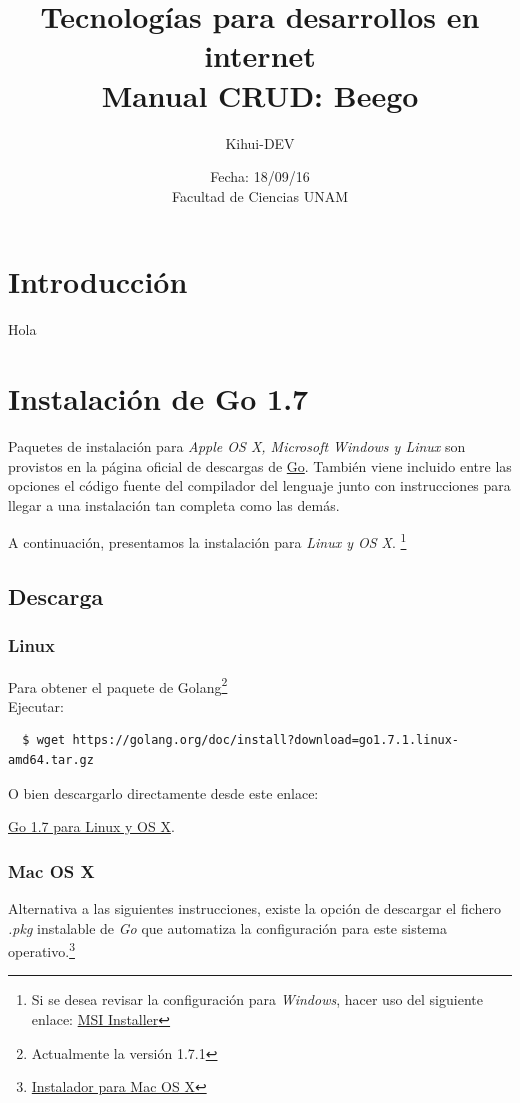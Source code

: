 \documentclass[12pt]{article}
\title{Tecnologías para desarrollos en internet \\ Manual CRUD: Beego}
\author{Kihui-DEV}
\date{Fecha: 18/09/16 \\ Facultad de Ciencias UNAM}
\begin{document}
\maketitle
\tableofcontents{}
\newpage

\section{Introducción}
Hola
\newpage
\section{Instalación de Go 1.7}
Paquetes de instalación para \textit{Apple OS X, Microsoft Windows y Linux} son provistos en la página oficial de descargas de \href{https://golang.org/dl/}{Go}. También viene incluido entre las opciones el código fuente del compilador del lenguaje junto con instrucciones para llegar a una instalación tan completa como las demás. \par
A continuación, presentamos la instalación para \textit{Linux y OS X}. \footnote{Si se desea revisar la configuración para \textit{Windows}, hacer uso del siguiente enlace:
  \href{https://golang.org/doc/install?download=go1.7.1.windows-amd64.msi}{MSI Installer}}

\subsection{Descarga}\label{sec:d}


\subsubsection*{Linux}
Para obtener el paquete de Golang\footnote{Actualmente la versión 1.7.1} \\
Ejecutar:
\begin{verbatim}
  $ wget https://golang.org/doc/install?download=go1.7.1.linux-amd64.tar.gz
\end{verbatim}
O bien descargarlo directamente desde este enlace:
\begin{center}
\href{https://golang.org/doc/install?download=go1.7.1.linux-amd64.tar.gz}{Go 1.7 para Linux y OS X}.
\end{center}


\subsubsection*{Mac OS X}
Alternativa a las siguientes instrucciones, existe la opción de descargar el fichero \textit{.pkg} instalable de \textit{Go} que automatiza la configuración para este sistema operativo.\footnote{\href{https://golang.org/doc/install?download=go1.7.1.darwin-amd64.pkg}{Instalador para Mac OS X}}\\[1mm]
\end{document}
